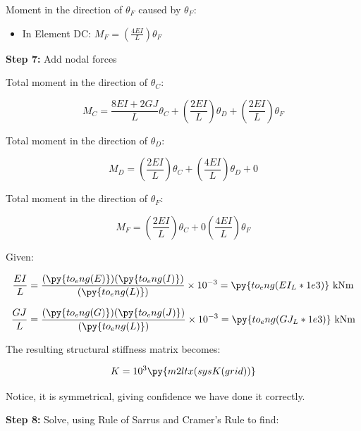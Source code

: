 \documentclass[a4paper,11pt]{article}
\begin{document}
\begin{hidden}
Moment in the direction of $\theta_F$ caused by $\theta_F$: 

\begin{itemize}
	\item In Element DC: $M_F = \left(\frac{4EI}{L}\right)\theta_F$
\end{itemize}			
		
\textbf{Step 7:} Add nodal forces

Total moment in the direction of $\theta_C$: 

\begin{equation}
	M_C = \frac{8EI+2GJ}{L}\theta_C +  \left(\frac{2EI}{L}\right)\theta_D + \left(\frac{2EI}{L}\right)\theta_F  
\end{equation}

Total moment in the direction of $\theta_D$: 

\begin{equation}
	M_D = \left(\frac{2EI}{L}\right)\theta_C + \left(\frac{4EI}{L}\right)\theta_D + 0  
\end{equation}

Total moment in the direction of $\theta_F$:

\begin{equation}
	M_F = \left(\frac{2EI}{L}\right)\theta_C + 0 \left(\frac{4EI}{L}\right)\theta_F  
\end{equation}

Given: 

\begin{equation}
\frac{EI}{L} = \frac{ \left( \py{to_eng(E)} \right)\left(\py{to_eng(I)}\right) }
					{ \left(\py{to_eng(L)}\right) } \times 10^{-3}
				=\py{to_eng(EI_L*1e3)}~\mathrm{kNm}
\end{equation}


\begin{equation}
\frac{GJ}{L} = \frac{ \left( \py{to_eng(G)} \right)\left(\py{to_eng(J)}\right) }
					{ \left(\py{to_eng(L)}\right) } \times 10^{-3}
				=\py{to_eng(GJ_L*1e3)}~\mathrm{kNm}
\end{equation}

The resulting structural stiffness matrix becomes: 

\begin{equation}
	K = 10^3 \py{m2ltx(sysK(grid))}
\end{equation}

Notice, it is symmetrical, giving confidence we have done it correctly.  

\textbf{Step 8:} Solve, using Rule of Sarrus and Cramer's Rule to find:
	

\end{hidden}
\end{document}
